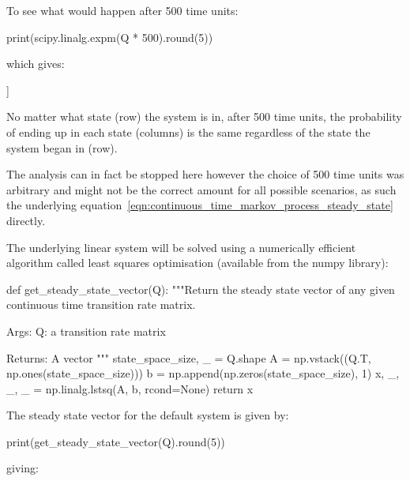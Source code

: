 To see what would happen after 500 time units:

\begin{pyin}
print(scipy.linalg.expm(Q * 500).round(5))
\end{pyin}

which gives:

\begin{pyout}
[[0.03431 0.08577 0.10722 0.13402 0.16752 0.2094  0.26176]
 [0.03431 0.08577 0.10722 0.13402 0.16752 0.2094  0.26176]
 [0.03431 0.08577 0.10722 0.13402 0.16752 0.2094  0.26176]
 [0.03431 0.08577 0.10722 0.13402 0.16752 0.2094  0.26176]
 [0.03431 0.08577 0.10722 0.13402 0.16752 0.2094  0.26176]
 [0.03431 0.08577 0.10722 0.13402 0.16752 0.2094  0.26176]
 [0.03431 0.08577 0.10722 0.13402 0.16752 0.2094  0.26176]]
\end{pyout}

No matter what state (row) the system is in,
after 500 time units, the probability of ending up in each state (columns) is
the same regardless of the state the system began in (row).

The analysis can in fact be stopped here
however the choice of 500 time units was arbitrary and might not be the correct
amount for all possible scenarios, as such the
underlying equation~\ref{eqn:continuous_time_markov_process_steady_state}
directly.

The underlying linear system will be solved using a numerically efficient
algorithm called least squares optimisation (available from the
numpy library):

\begin{pyin}
def get_steady_state_vector(Q):
    """Return the steady state vector of any given continuous time
    transition rate matrix.

    Args:
       Q: a transition rate matrix

    Returns:
        A vector
    """
    state_space_size, _ = Q.shape
    A = np.vstack((Q.T, np.ones(state_space_size)))
    b = np.append(np.zeros(state_space_size), 1)
    x, _, _, _ = np.linalg.lstsq(A, b, rcond=None)
    return x
\end{pyin}

The steady state vector for the default system is given by:

\begin{pyin}
print(get_steady_state_vector(Q).round(5))
\end{pyin}

giving:

\begin{pyout}
[0.03431 0.08577 0.10722 0.13402 0.16752 0.2094  0.26176]
\end{pyout}

